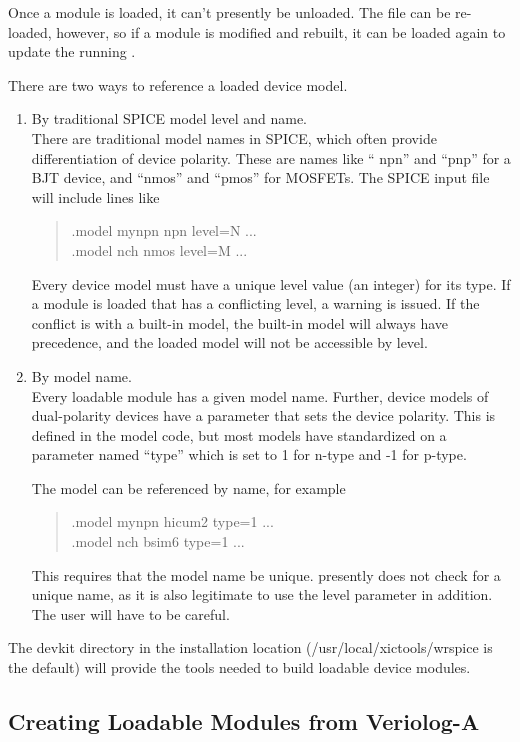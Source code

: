 Once a module is loaded, it can't presently be unloaded.  The file can
be re-loaded, however, so if a module is modified and rebuilt, it can
be loaded again to update the running {\WRspice}.

There are two ways to reference a loaded device model.
\begin{enumerate}
\item{By traditional SPICE model level and name.\\
There are traditional model names in SPICE, which often provide
differentiation of device polarity.  These are names like ``{\vt
npn}'' and ``{\vt pnp}'' for a BJT device, and ``{\vt nmos}'' and
``{\vt pmos}'' for MOSFETs.  The SPICE input file will include lines
like
\begin{quote}
{\vt .model mynpn npn level=N ...}\\
{\vt .model nch nmos level=M ...}
\end{quote}
Every device model must have a unique {\vt level} value (an integer)
for its type.  If a module is loaded that has a conflicting level, a
warning is issued.  If the conflict is with a built-in model, the
built-in model will always have precedence, and the loaded model will
not be accessible by level.}

\item{By model name.\\
Every loadable module has a given model name.  Further, device models
of dual-polarity devices have a parameter that sets the device
polarity.  This is defined in the model code, but most models have
standardized on a parameter named ``{\vt type}'' which is set to 1 for
n-type and -1 for p-type.

The model can be referenced by name, for example
\begin{quote}
{\vt .model mynpn hicum2 type=1 ...}\\
{\vt .model nch bsim6 type=1 ...}
\end{quote}
This requires that the model name be unique.  {\WRspice} presently
does not check for a unique name, as it is also legitimate to use the
level parameter in addition.  The user will have to be careful.}
\end{enumerate}

The {\vt devkit} directory in the {\WRspice} installation location
({\vt /usr/local/xictools/wrspice} is the default) will provide
the tools needed to build loadable device modules.

\subsection{Creating Loadable Modules from Veriolog-A}

